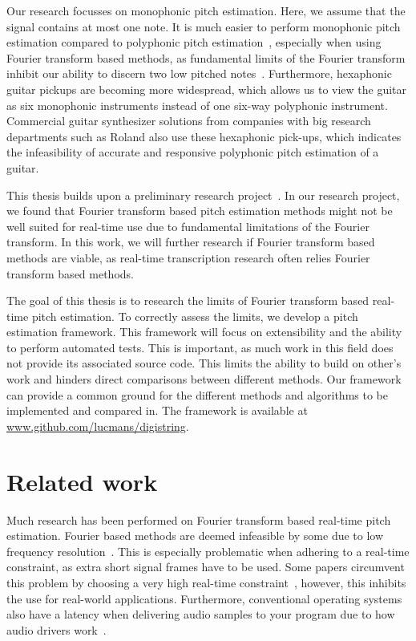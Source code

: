 \documentclass[10pt,twocolumn]{article}
\begin{document}
Our research focusses on monophonic pitch estimation. Here, we assume that the signal contains at most one note. It is much easier to perform monophonic pitch estimation compared to polyphonic pitch estimation~\cite{monotopoly}, especially when using Fourier transform based methods, as fundamental limits of the Fourier transform inhibit our ability to discern two low pitched notes~\cite{nopoly}. Furthermore, hexaphonic guitar pickups are becoming more widespread, which allows us to view the guitar as six monophonic instruments instead of one six-way polyphonic instrument. Commercial guitar synthesizer solutions from companies with big research departments such as Roland also use these hexaphonic pick-ups, which indicates the infeasibility of accurate and responsive polyphonic pitch estimation of a guitar.

This thesis builds upon a preliminary research project~\cite{ik}. In our research project, we found that Fourier transform based pitch estimation methods might not be well suited for real-time use due to fundamental limitations of the Fourier transform. In this work, we will further research if Fourier transform based methods are viable, as real-time transcription research often relies Fourier transform based methods.

The goal of this thesis is to research the limits of Fourier transform based real-time pitch estimation. To correctly assess the limits, we develop a pitch estimation framework. This framework will focus on extensibility and the ability to perform automated tests. This is important, as much work in this field does not provide its associated source code. This limits the ability to build on other's work and hinders direct comparisons between different methods. Our framework can provide a common ground for the different methods and algorithms to be implemented and compared in. The framework is available at \url{www.github.com/lucmans/digistring}.


\section{Related work}
Much research has been performed on Fourier transform based real-time pitch estimation. Fourier based methods are deemed infeasible by some due to low frequency resolution~\cite{fourierlimit}. This is especially problematic when adhering to a real-time constraint, as extra short signal frames have to be used. Some papers circumvent this problem by choosing a very high real-time constraint~\cite{sloomboi}\cite{sloomboi2}, however, this inhibits the use for real-world applications. Furthermore, conventional operating systems also have a latency when delivering audio samples to your program due to how audio drivers work~\cite{oslatency}.
\end{document}
